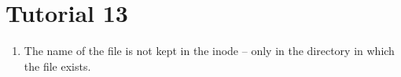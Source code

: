 \documentclass[12pt,a4paper]{article}
\begin{document}
\section{Tutorial 13}

\begin{enumerate}
  \item The name of the file is not kept in the inode -- only in the directory in which the file exists.
\end{enumerate}
\end{document}
